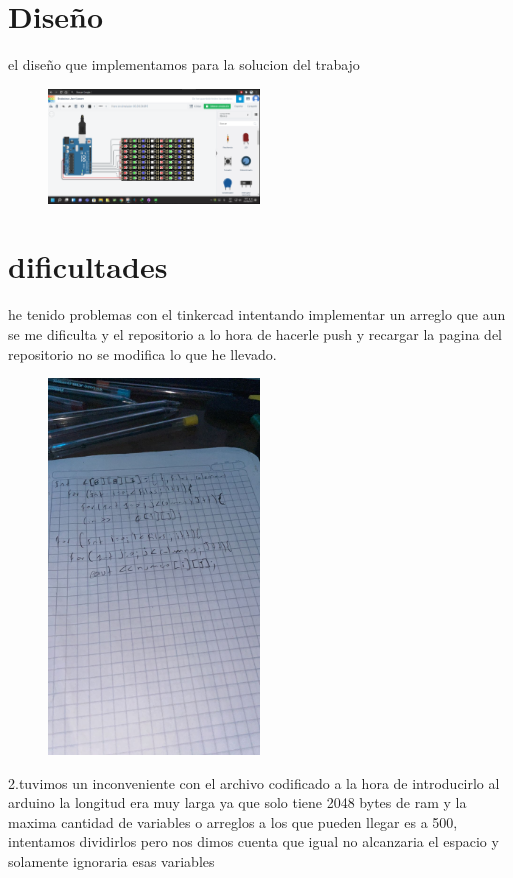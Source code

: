 \documentclass{article}
\begin{document}
\section{Diseño}
el diseño que implementamos para la solucion del trabajo
\begin{figure}
\includegraphics[width=0.5\textwidth]{image1.png}
\end{figure}
\section{dificultades}
he tenido problemas con el tinkercad intentando implementar un arreglo que aun se me dificulta y el repositorio a lo hora de hacerle push y recargar la pagina del repositorio no se modifica lo que he llevado.
\begin{figure}
\centering
\includegraphics[width=0.5\textwidth]{1.jpeg}
\end{figure}
2.tuvimos un inconveniente con el archivo codificado a la hora de introducirlo al arduino la longitud era muy larga ya que solo tiene 2048 bytes de ram y la maxima cantidad de variables o arreglos a los que pueden llegar es a 500, intentamos dividirlos pero nos dimos cuenta que igual no alcanzaria el espacio y solamente ignoraria esas variables 
\end{document}
